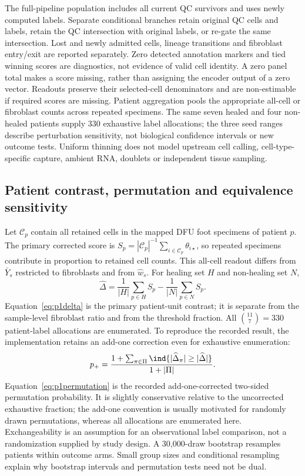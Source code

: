 \documentclass[10pt,a4paper]{article}
\begin{document}
The full-pipeline population includes all current QC survivors and uses newly computed labels. Separate conditional branches retain original QC cells and labels, retain the QC intersection with original labels, or re-gate the same intersection. Lost and newly admitted cells, lineage transitions and fibroblast entry/exit are reported separately. Zero detected annotation markers and tied winning scores are diagnostics, not evidence of valid cell identity. A zero panel total makes a score missing, rather than assigning the encoder output of a zero vector. Readouts preserve their selected-cell denominators and are non-estimable if required scores are missing. Patient aggregation pools the appropriate all-cell or fibroblast counts across repeated specimens. The same seven healed and four non-healed patients supply 330 exhaustive label allocations; the three seed ranges describe perturbation sensitivity, not biological confidence intervals or new outcome tests. Uniform thinning does not model upstream cell calling, cell-type-specific capture, ambient RNA, doublets or independent tissue sampling.

\subsection{Patient contrast, permutation and equivalence sensitivity}
Let $\mathcal C_p$ contain all retained cells in the mapped DFU foot specimens of patient $p$. The primary corrected score is $S_p=|\mathcal C_p|^{-1}\sum_{i\in\mathcal C_p}\theta_{i\star}$, so repeated specimens contribute in proportion to retained cell counts. This all-cell readout differs from $\bar Y_s$ restricted to fibroblasts and from $\widehat w_s$. For healing set $H$ and non-healing set $N$,
\begin{equation}
\widehat\Delta=\frac1{|H|}\sum_{p\in H}S_p-\frac1{|N|}\sum_{p\in N}S_p.\label{eq:p1delta}
\end{equation}
Equation~\eqref{eq:p1delta} is the primary patient-unit contrast; it is separate from the sample-level fibroblast ratio and from the threshold fraction. All $\binom{11}{7}=330$ patient-label allocations are enumerated. To reproduce the recorded result, the implementation retains an add-one correction even for exhaustive enumeration:
\begin{equation}
p_{+}=\frac{1+\sum_{\pi\in\Pi}\ind\{|\widehat\Delta_\pi|\geq|\widehat\Delta|\}}{1+|\Pi|}.\label{eq:p1permutation}
\end{equation}
Equation~\eqref{eq:p1permutation} is the recorded add-one-corrected two-sided permutation probability. It is slightly conservative relative to the uncorrected exhaustive fraction; the add-one convention is usually motivated for randomly drawn permutations, whereas all allocations are enumerated here. Exchangeability is an assumption for an observational label comparison, not a randomization supplied by study design. A 30,000-draw bootstrap resamples patients within outcome arms. Small group sizes and conditional resampling explain why bootstrap intervals and permutation tests need not be dual.
\end{document}
